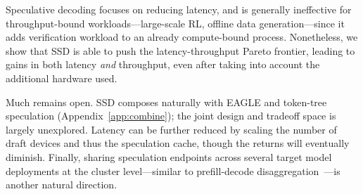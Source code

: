 Speculative decoding focuses on reducing latency, and is generally ineffective for throughput-bound workloads---large-scale RL, offline data generation---since it adds verification workload to an already compute-bound process.
Nonetheless, we show that SSD is able to push the latency-throughput Pareto frontier, leading to gains in both latency \textit{and} throughput, even after taking into account the additional hardware used.

Much remains open.
SSD composes naturally with EAGLE and token-tree speculation (Appendix~\ref{app:combine}); the joint design and tradeoff space is largely unexplored.
Latency can be further reduced by scaling the number of draft devices and thus the speculation cache, though the returns will eventually diminish.
Finally, sharing speculation endpoints across several target model deployments at the cluster level---similar to prefill-decode disaggregation~\citep{disagg}---is another natural direction.

\color{black}
